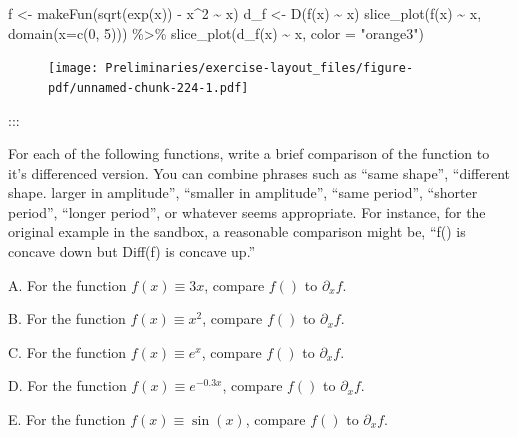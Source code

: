 \documentclass[
  letterpaper,
  DIV=11,
  numbers=noendperiod,
  oneside]{article}
\newenvironment{Shaded}{\begin{snugshade}}{\end{snugshade}}
\newcommand{\AttributeTok}[1]{\textcolor[rgb]{0.40,0.45,0.13}{#1}}
\newcommand{\DecValTok}[1]{\textcolor[rgb]{0.68,0.00,0.00}{#1}}
\newcommand{\FunctionTok}[1]{\textcolor[rgb]{0.28,0.35,0.67}{#1}}
\newcommand{\NormalTok}[1]{\textcolor[rgb]{0.00,0.23,0.31}{#1}}
\newcommand{\OtherTok}[1]{\textcolor[rgb]{0.00,0.23,0.31}{#1}}
\newcommand{\SpecialCharTok}[1]{\textcolor[rgb]{0.37,0.37,0.37}{#1}}
\newcommand{\StringTok}[1]{\textcolor[rgb]{0.13,0.47,0.30}{#1}}
\begin{document}
\begin{multicols}{2}
\begin{Shaded}
\begin{Highlighting}[]
\NormalTok{f   }\OtherTok{\textless{}{-}} \FunctionTok{makeFun}\NormalTok{(}\FunctionTok{sqrt}\NormalTok{(}\FunctionTok{exp}\NormalTok{(x)) }\SpecialCharTok{{-}}\NormalTok{ x}\SpecialCharTok{\^{}}\DecValTok{2} \SpecialCharTok{\textasciitilde{}}\NormalTok{ x)}
\NormalTok{d\_f }\OtherTok{\textless{}{-}} \FunctionTok{D}\NormalTok{(}\FunctionTok{f}\NormalTok{(x) }\SpecialCharTok{\textasciitilde{}}\NormalTok{ x)}
\FunctionTok{slice\_plot}\NormalTok{(}\FunctionTok{f}\NormalTok{(x) }\SpecialCharTok{\textasciitilde{}}\NormalTok{ x, }\FunctionTok{domain}\NormalTok{(}\AttributeTok{x=}\FunctionTok{c}\NormalTok{(}\DecValTok{0}\NormalTok{, }\DecValTok{5}\NormalTok{))) }\SpecialCharTok{\%\textgreater{}\%}
  \FunctionTok{slice\_plot}\NormalTok{(}\FunctionTok{d\_f}\NormalTok{(x) }\SpecialCharTok{\textasciitilde{}}\NormalTok{ x, }\AttributeTok{color =} \StringTok{"orange3"}\NormalTok{)}
\end{Highlighting}
\end{Shaded}

\begin{figure}[H]

{\centering \texttt{[image: Preliminaries/exercise-layout\_files/figure-pdf/unnamed-chunk-224-1.pdf]}

}

\end{figure}

:::

For each of the following functions, write a brief comparison of the
function to it's differenced version. You can combine phrases such as
``same shape'', ``different shape. larger in amplitude'', ``smaller in
amplitude'', ``same period'', ``shorter period'', ``longer period'', or
whatever seems appropriate. For instance, for the original example in
the sandbox, a reasonable comparison might be, ``f() is concave down but
Diff(f) is concave up.''

A. For the function \(f(x) \equiv 3 x\), compare \(f()\) to
\(\partial_x f\).

B. For the function \(f(x) \equiv x^2\), compare \(f()\) to
\(\partial_x f\).

C. For the function \(f(x) \equiv e^x\), compare \(f()\) to
\(\partial_x f\).

D. For the function \(f(x) \equiv e^{-0.3 x}\), compare \(f()\) to
\(\partial_x f\).

E. For the function \(f(x) \equiv \sin(x)\), compare \(f()\) to
\(\partial_x f\).


\end{multicols}
\end{document}
